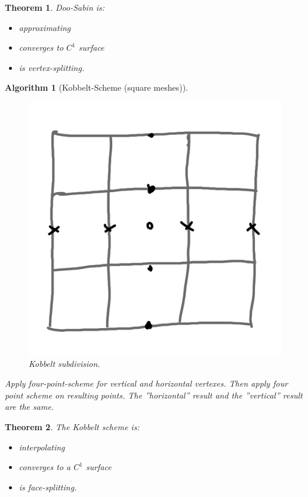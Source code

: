 \documentclass[]{article}
\newtheorem{theorem}{Theorem}
\newtheorem{algorithm}{Algorithm}
\begin{document}
\begin{theorem}
	Doo-Sabin is:
	\begin{itemize}
		\item approximating
		\item converges to $C^1$ surface
		\item is vertex-splitting.
	\end{itemize}
\end{theorem}

\begin{algorithm}[Kobbelt-Scheme (square meshes)]
	\begin{figure}[h!]
	\centering
	\includegraphics[width=0.3\linewidth]{figures/kobbelt}
	\caption{Kobbelt subdivision.}
	\label{fig:kobbelt}
	\end{figure}

	Apply four-point-scheme for vertical and horizontal vertexes. Then apply four point scheme on resulting points. The ''horizontal'' result and the ''vertical'' result are the same.
\end{algorithm}

\begin{theorem}
	The Kobbelt scheme is:
	\begin{itemize}
		\item interpolating
		\item converges to a $C^1$ surface
		\item is face-splitting.
	\end{itemize}
\end{theorem}
\end{document}
